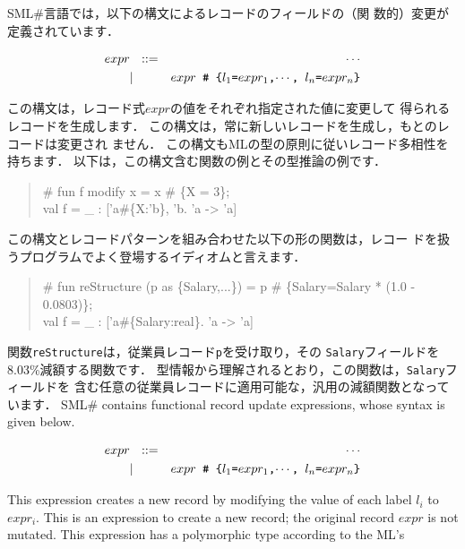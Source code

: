 \documentclass{jbook}
\newif\ifjp
\newcommand{\smlsharp}{SML\#}
\begin{document}
\ifjp%
	\smlsharp{}言語では，以下の構文によるレコードのフィールドの（関
数的）変更が定義されています．
\begin{tt}
\begin{eqnarray*}
expr &\mbox{\ \ }::=& \cdots \\
     &|& \mbox{\tt $expr$ {\#} \{$l_1$=$expr_1$,$\cdots$, $l_n$=$expr_n$\}}
\end{eqnarray*}
\end{tt}
	この構文は，レコード式$expr$の値をそれぞれ指定された値に変更して
得られるレコードを生成します．
	この構文は，常に新しいレコードを生成し，もとのレコードは変更され
ません．
	この構文もMLの型の原則に従いレコード多相性を持ちます．
	以下は，この構文含む関数の例とその型推論の例です．
\begin{tt}\begin{quote}
\# fun f modify x = x \# \{X = 3\};\\
val f = \_ : ['a\#\{X:'b\}, 'b.  'a -> 'a]
\end{quote}\end{tt}
	この構文とレコードパターンを組み合わせた以下の形の関数は，レコー
ドを扱うプログラムでよく登場するイディオムと言えます．
\begin{tt}\begin{quote}
\# fun reStructure (p as \{Salary,...\}) = p \# \{Salary=Salary * (1.0 - 0.0803)\};\\
val f = \_ : ['a\#\{Salary:real\}.  'a -> 'a]
\end{quote}\end{tt}
	関数{\tt reStructure}は，従業員レコード{\tt p}を受け取り，その
{\tt Salary}フィールドを8.03\%減額する関数です．
	型情報から理解されるとおり，この関数は，{\tt Salary}フィールドを
含む任意の従業員レコードに適用可能な，汎用の減額関数となっています．
\else%
	\smlsharp{} contains functional record update expressions, whose
syntax is given below.
\begin{tt}
\begin{eqnarray*}
expr &\mbox{\ \ }::=& \cdots \\
     &|& \mbox{\tt $expr$ {\#} \{$l_1$=$expr_1$,$\cdots$, $l_n$=$expr_n$\}}
\end{eqnarray*}
\end{tt}
	This expression creates a new record by modifying the value of
each label $l_i$ to $expr_i$.
	This is an expression to create a new record; the original
record $expr$ is not mutated.
	This expression has a polymorphic type according to the ML's
\end{document}
